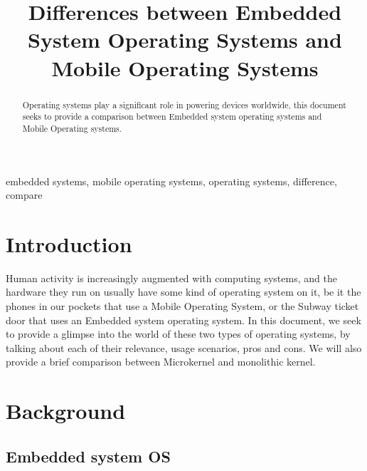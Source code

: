 \documentclass[conference]{IEEEtran}
\begin{document}
\title{Differences between Embedded System Operating Systems and Mobile Operating Systems\\
}



\maketitle

\begin{abstract}
Operating systems play a significant role in powering devices worldwide, this document seeks to provide a comparison between Embedded system operating systems and Mobile Operating systems.
\end{abstract}

\begin{IEEEkeywords}
embedded systems, mobile operating systems, operating systems, difference, compare
\end{IEEEkeywords}

\section{Introduction}
Human activity is increasingly augmented with computing systems, and the hardware they run on usually have some kind of operating system on it, be it the phones in our pockets that use a Mobile Operating System, or the Subway ticket door that uses an Embedded system operating system. In this document, we seek to provide a glimpse into the world of these two types of operating systems, by talking about each of their relevance, usage scenarios, pros and cons. We will also provide a brief comparison between Microkernel and monolithic kernel.

\section{Background}
\subsection{Embedded system OS}
\end{document}

